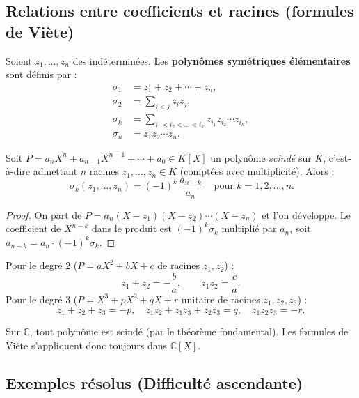 \subsection{Relations entre coefficients et racines (formules de Viète)}

Soient $z_1, \dots, z_n$ des indéterminées. Les \textbf{polynômes symétriques élémentaires} sont définis par :
\begin{align*}
\sigma_1 &= z_1 + z_2 + \cdots + z_n, \\
\sigma_2 &= \sum_{i < j} z_i z_j, \\
\sigma_k &= \sum_{i_1 < i_2 < \dots < i_k} z_{i_1} z_{i_2} \cdots z_{i_k}, \\
\sigma_n &= z_1 z_2 \cdots z_n.
\end{align*}

\begin{theoreme}
Soit $P = a_n X^n + a_{n-1} X^{n-1} + \cdots + a_0 \in K[X]$ un polynôme \emph{scindé} sur $K$, c'est-à-dire admettant $n$ racines $z_1, \dots, z_n \in K$ (comptées avec multiplicité). Alors :
\[ \boxed{\ \sigma_k(z_1, \dots, z_n) = (-1)^k\, \frac{a_{n-k}}{a_n}\ } \quad \text{pour } k = 1, 2, \dots, n. \]
\end{theoreme}

\begin{proof}
On part de $P = a_n (X - z_1)(X - z_2) \cdots (X - z_n)$ et l'on développe. Le coefficient de $X^{n-k}$ dans le produit est $(-1)^k \sigma_k$ multiplié par $a_n$, soit $a_{n-k} = a_n \cdot (-1)^k \sigma_k$.
\end{proof}

\begin{remarque}
Pour le degré 2 ($P = aX^2 + bX + c$ de racines $z_1, z_2$) :
\[ z_1 + z_2 = -\frac{b}{a}, \qquad z_1 z_2 = \frac{c}{a}. \]
Pour le degré 3 ($P = X^3 + pX^2 + qX + r$ unitaire de racines $z_1, z_2, z_3$) :
\[ z_1 + z_2 + z_3 = -p, \quad z_1 z_2 + z_1 z_3 + z_2 z_3 = q, \quad z_1 z_2 z_3 = -r. \]
\end{remarque}

\begin{remarque}
Sur $\mathbb{C}$, tout polynôme est scindé (par le théorème fondamental). Les formules de Viète s'appliquent donc toujours dans $\mathbb{C}[X]$.
\end{remarque}

\subsection{Exemples résolus (Difficulté ascendante)}

